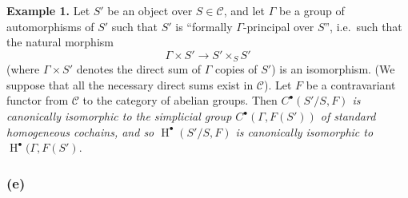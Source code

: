 \documentclass{article}
\newenvironment{rmenv}[1]
  {\phantomsection\par\smallskip\noindent\textbf{#1.}\rmfamily}
  {\par\smallskip}
\theoremstyle{definition}
\theoremstyle{definition}
\theoremstyle{definition}
\theoremstyle{definition}
\theoremstyle{remark}
\begin{document}
\leavevmode{}%
\begin{rmenv}{Example 1}
Let \(S'\) be an object over \(S\in{\mathcal{C}}\), and let \(\Gamma\) be a group of automorphisms of \(S'\) such that \(S'\) is ``formally \(\Gamma\)-principal over \(S\)'', i.e.~such that the natural morphism
\[
  \Gamma\times S' \to S'\times_S S'
\]
(where \(\Gamma\times S'\) denotes the direct sum of \(\Gamma\) copies of \(S'\)) is an isomorphism.
(We suppose that all the necessary direct sums exist in \({\mathcal{C}}\)).
Let \(F\) be a contravariant functor from \({\mathcal{C}}\) to the category of abelian groups.
Then \emph{\(C^\bullet(S'/S,F)\) is canonically isomorphic to the simplicial group \(C^\bullet(\Gamma,F(S'))\) of standard homogeneous cochains, and so \(\operatorname{H}^\bullet(S'/S,F)\) is canonically isomorphic to \(\operatorname{H}^\bullet(\Gamma,F(S')\)}.

\end{rmenv}

\hypertarget{fga-3-i-section-A.4.e}{%
\subsubsection{(e)}\label{fga-3-i-section-A.4.e}}
\end{document}
